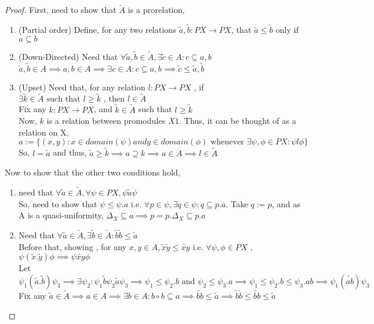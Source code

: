 \documentclass[18pt,a4paper]{article}
\makeatletter
\theoremstyle{definition}
\newcommand{\carrow}{}%
\DeclareRobustCommand{\carrow}{%
	\mathrel{\vphantom{\rightarrow}\mathpalette\circle@arrow\relax}%
}
\newcommand{\circle@arrow}[2]{%
	\m@th
	\ooalign{%
		\hidewidth$#1\circ\mkern1mu$\hidewidth\cr
	$#1\longrightarrow$\cr}%
}
\makeatother
\begin{document}
\begin{proof}
	First, need to show that $\tilde{A}$ is a prorelation,
	\begin{enumerate}[label=(\roman*)]
		\item (Partial order) Define, for any two relations $\tilde{a},\tilde{b}:PX \to PX $,
			that $ \tilde{a} \leq \tilde{b}$ only if $a \subseteq b$
		\item(Down-Directed) Need that $\forall \tilde{a} ,\tilde{b} \in \tilde{A} ,
			\exists \tilde{c} \in A : c \subseteq a,b$\\
			$\tilde{a} ,\tilde{b} \in A \implies a,b \in A \implies \exists c \in A: c \subseteq
			a,b \implies \tilde{c} \leq \tilde{a} ,\tilde{b} $
		\item (Upset) Need that, for any relation $l:PX \to PX$ , if  $\exists \tilde{k} \in
			\tilde{A} \text{ such that }  l \geq \tilde{k} \text{ , then } l \in \tilde{A} $\\
			Fix any $k:PX \to PX$, and $\tilde{k} \in \tilde{A}$ such that $l\geq \tilde{k} $\\
			Now, $k$ is a relation between promodules $X \carrow 1$. Thus, it can be thought
			of as a relation on X,\\
			$a:=\{(x,y): x \in domain(\psi) and y \in domain(\phi)
			\text{ whenever } \exists \psi,\phi \in PX: \psi l \phi\}$ \\
			So, $l=\tilde{a}$ and thus, $\tilde{a} \geq \tilde{k} \implies a \supseteq k
			\implies a\in A \implies l \in \tilde{A} $
	\end{enumerate}
	Now to show that the other two conditions hold,
	\begin{enumerate}[label=(\roman*)]
		\item need that $\forall \tilde{a} \in \tilde{A} , \forall \psi \in PX, \psi \tilde{a} \psi$\\
			So, need to show that $\psi \leq \psi.a$ i.e. $\forall p\in \psi, \exists q\in \psi:
			q \subseteq p.a$. Take $q:=p$, and as A is a quasi-uniformity,
			$\Delta_X \subseteq a \implies p=p.\Delta_X \subseteq p.a$
		\item Need that $\forall \tilde{a} \in \tilde{A} , \exists \tilde{b}\in \tilde{A}:
			\tilde{b}\tilde{b} \leq \tilde{a} $\\
			Before that, showing , for any $x,y \in A, \tilde{x} \tilde{y} \leq \widetilde{xy} $
			i.e. $\forall \psi, \phi \in PX$ , $\psi(\tilde{x}.\tilde{y})\phi \implies
			\psi \widetilde{xy} \phi $\\
			Let $\psi_1(\tilde{a} .\tilde{b} )\psi_3 \implies \exists \psi_2:
			\psi_1 \tilde{b} \psi_2 \tilde{a} \psi_3 \implies
			\psi_1 \leq \psi_2.b \text{ and } \psi_2 \leq \psi_3.a
			\implies \psi_1 \leq \psi_2.b \leq \psi_3.ab \implies \psi_1(\widetilde{ab})\psi_3$
			\\
			Fix any $\tilde{a}\in \tilde{A} \implies a\in A \implies \exists b \in A: b \circ b \subseteq
			a \implies \widetilde{bb} \leq \tilde{a} \implies \tilde{b} \tilde{b} \leq
			\widetilde{bb} \leq \tilde{a}  $

	\end{enumerate}
\end{proof}
\end{document}
